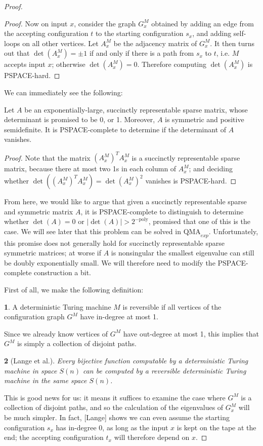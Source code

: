 \documentclass[english]{article}
\numberwithin{equation}{section}
\numberwithin{figure}{section}
\theoremstyle{plain}
\newtheorem{thm}{\protect\theoremname}
\theoremstyle{definition}
\newtheorem{defn}[thm]{\protect\definitionname}
\theoremstyle{plain}
\theoremstyle{definition}
\theoremstyle{remark}
\theoremstyle{remark}
\theoremstyle{plain}
\providecommand{\definitionname}{Definition}
\providecommand{\theoremname}{Theorem}
\begin{document}
\begin{proof}
\begin{proof}
Now on input $x$, consider the graph $G^M_x$ obtained by adding an edge from the accepting configuration $t$ to the starting configuration $s_x$, and adding self-loops on all other vertices. Let $A^M_x$ be the adjacency matrix of $G^M_x$. It then turns out that $\det(A^M_x) = \pm 1$ if and only if there is a path from $s_x$ to $t$, i.e. $M$ accepts input $x$; otherwise $\det(A^M_x) = 0$. Therefore computing $\det(A^M_x)$ is PSPACE-hard.
\end{proof}
We can immediately see the following:
\begin{cor}
Let $A$ be an exponentially-large, succinctly representable sparse matrix, whose determinant is promised to be 0, or 1. Moreover, $A$ is symmetric and positive semidefinite. It is PSPACE-complete to determine if the determinant of $A$ vanishes.
\end{cor}
\begin{proof}
Note that the matrix $(A^M_x)^T A^M_x$ is a succinctly representable sparse matrix, because there at most two 1s in each column of $A^M_x$; and deciding whether $\det((A^M_x)^T A^M_x) = \det(A^M_x)^2$ vanishes is PSPACE-hard.
\end{proof}

From here, we would like to argue that given a succinctly representable sparse and symmetric matrix $A$, it is PSPACE-complete to distinguish to determine whether $\det(A) = 0$ or $|\det(A)| > 2^{-\text{poly}}$, promised that one of this is the case. We will see later that this problem can be solved in $\text{QMA}_{exp}$. Unfortunately, this promise does not generally hold for succinctly representable sparse symmetric matrices; at worse if $A$ is nonsingular the smallest eigenvalue can still be doubly exponentially small. We will therefore need to modify the PSPACE-complete construction a bit.

First of all, we make the following definition:
\begin{defn}
A deterministic Turing machine $M$ is reversible if all vertices of the configuration graph $G^M$ have in-degree at most 1.
\end{defn}
Since we already know vertices of $G^M$ have out-degree at most 1, this implies that $G^M$ is simply a collection of disjoint paths.
\begin{thm}[Lange et al.]
Every bijective function computable by a deterministic Turing machine in space $S(n)$ can be computed by a reversible deterministic Turing machine in the same space $S(n)$.
\end{thm}
This is good news for us: it means it suffices to examine the case where $G^M$ is a collection of disjoint paths, and so the calculation of the eigenvalues of $G^M_x$ will be much simpler. In fact, [Lange] shows we can even assume the starting configuration $s_x$ has in-degree 0, as long as the input $x$ is kept on the tape at the end; the accepting configuration $t_x$ will therefore depend on $x$. 


\end{proof}
\end{document}
